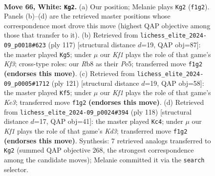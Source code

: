 \documentclass[11pt]{article}
\begin{document}
\clearpage

\begin{figure}[p]\centering
\begin{subfigure}{0.46\textwidth}\centering
\resizebox{\linewidth}{!}{%
\newchessgame
\chessboard[
  setfen={1R6/R4pk1/4p3/8/P3P3/5P2/8/r4K2 w - - 23 66},
  showmover=false,
  pgfstyle=straightmove, color=movearrow, markmove={f1-g2}
]}
\caption{}
\end{subfigure}\hfill
\begin{subfigure}{0.46\textwidth}\centering
\resizebox{\linewidth}{!}{%
\newchessgame
\chessboard[
  setfen={8/8/R4k2/4p3/p5P1/6K1/r4P2/8 b - - 1 59},
  showmover=false,
  pgfstyle=straightmove, color=movearrow, markmove={f6-g5}
]}
\caption{}
\end{subfigure}
\\[4pt]
\begin{subfigure}{0.46\textwidth}\centering
\resizebox{\linewidth}{!}{%
\newchessgame
\chessboard[
  setfen={8/8/1R2k2p/4P1pP/2KP2r1/8/8/8 b - - 1 61},
  showmover=false,
  pgfstyle=straightmove, color=movearrow, markmove={e6-f5}
]}
\caption{}
\end{subfigure}\hfill
\begin{subfigure}{0.46\textwidth}\centering
\resizebox{\linewidth}{!}{%
\newchessgame
\chessboard[
  setfen={8/6k1/6p1/3r4/P5R1/1P1K4/6p1/8 w - - 2 60},
  showmover=false,
  pgfstyle=straightmove, color=movearrow, markmove={d3-c4}
]}
\caption{}
\end{subfigure}
\caption{\textbf{Move 66, White: \texttt{Kg2}.} (a) Our position; Melanie plays \texttt{Kg2} (\texttt{f1g2}). Panels (b)--(d) are the retrieved master positions whose correspondence most drove this move (highest QAP objective among those that transfer to it). (b) Retrieved from \texttt{lichess\_elite\_2024-09\_p0018\#623} (ply 117) [structural distance $d$=19, QAP obj=87]: the master played \texttt{Kg5}; under $\mu$ our \emph{Kf1} plays the role of that game's \emph{Kf3}; cross-type roles: our \emph{R}b8 as their \emph{P}e5; transferred move \texttt{f1g2} \textbf{(endorses this move)}. (c) Retrieved from \texttt{lichess\_elite\_2024-09\_p0005\#1712} (ply 121) [structural distance $d$=19, QAP obj=58]: the master played \texttt{Kf5}; under $\mu$ our \emph{Kf1} plays the role of that game's \emph{Ke3}; transferred move \texttt{f1g2} \textbf{(endorses this move)}. (d) Retrieved from \texttt{lichess\_elite\_2024-09\_p0024\#394} (ply 118) [structural distance $d$=17, QAP obj=41]: the master played \texttt{Kc4}; under $\mu$ our \emph{Kf1} plays the role of that game's \emph{Kd3}; transferred move \texttt{f1g2} \textbf{(endorses this move)}. Synthesis: 7 retrieved analogs transferred to \texttt{Kg2} (summed QAP objective 268, the strongest correspondence among the candidate moves); Melanie committed it via the \texttt{search} selector.}
\label{fig:thought-m130}
\end{figure}
\end{document}
